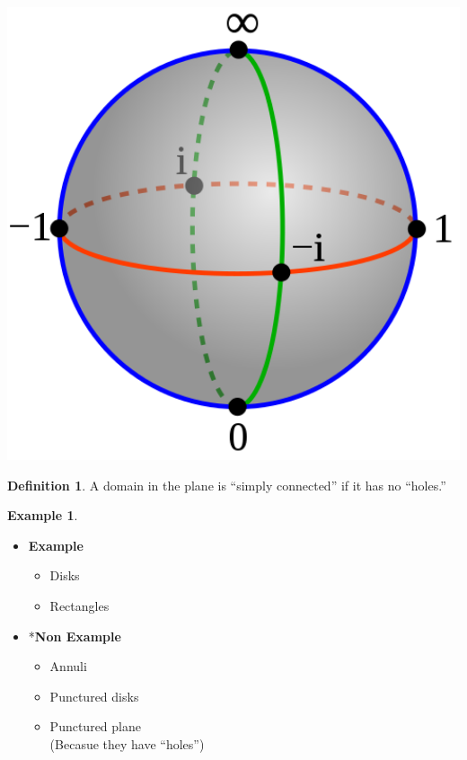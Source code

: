 \documentclass[
]{book}
\providecommand{\tightlist}{%
  \setlength{\itemsep}{0pt}\setlength{\parskip}{0pt}}
\theoremstyle{definition}
\newtheorem{definition}{Definition}[chapter]
\theoremstyle{definition}
\newtheorem{example}{Example}[chapter]
\theoremstyle{definition}
\theoremstyle{definition}
\theoremstyle{remark}
\begin{document}
\begin{center}\includegraphics[width=6.67in,height=0.5\textheight]{figures/Mario_Bonk/fig2} \end{center}

\begin{definition}
\protect\hypertarget{def:unnamed-chunk-30}{}\label{def:unnamed-chunk-30}A domain in the plane is ``simply connected'' if it has no ``holes.''
\end{definition}

\begin{example}
\protect\hypertarget{exm:unnamed-chunk-31}{}\label{exm:unnamed-chunk-31}\leavevmode

\begin{itemize}
\tightlist
\item
  \textbf{Example}

  \begin{itemize}
  \tightlist
  \item
    Disks
  \item
    Rectangles
  \end{itemize}
\item
  *\textbf{Non Example}

  \begin{itemize}
  \tightlist
  \item
    Annuli
  \item
    Punctured disks
  \item
    Punctured plane\\
    (Becasue they have ``holes'')
  \end{itemize}
\end{itemize}

\end{example}
\end{document}
